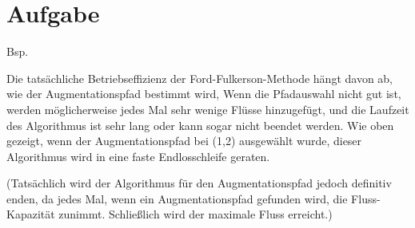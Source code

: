 \documentclass[fleqn]{article}
\begin{document}
\section{Aufgabe}








Bsp.


Die tatsächliche Betriebseffizienz der Ford-Fulkerson-Methode hängt davon ab, wie der Augmentationspfad bestimmt wird, Wenn die Pfadauswahl nicht gut ist, werden möglicherweise jedes Mal sehr wenige Flüsse hinzugefügt, und die Laufzeit des Algorithmus ist sehr lang oder kann sogar nicht beendet werden.
Wie oben gezeigt, wenn der Augmentationspfad bei (1,2) ausgewählt wurde, dieser Algorithmus wird in eine faste Endlosschleife geraten.

(Tatsächlich wird der Algorithmus für den Augmentationspfad jedoch definitiv enden, da jedes Mal, wenn ein Augmentationspfad gefunden wird, die Fluss-Kapazität zunimmt. Schließlich wird der maximale Fluss erreicht.)
\end{document}
